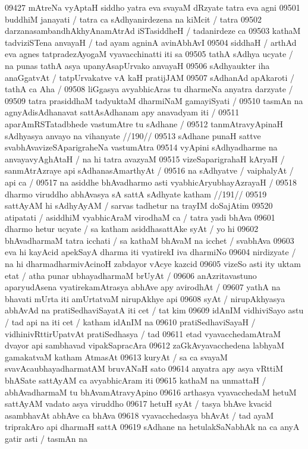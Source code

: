 09427 mAtreNa vyAptaH siddho yatra eva svayaM dRzyate tatra eva agni
09501 buddhiM janayati / tatra ca sAdhyanirdezena na kiMcit / tatra  
09502 darzanasambandhAkhyAnamAtrAd iSTasiddheH / tadanirdeze ca  
09503 kathaM tadviziSTena anvayaH / tad ayam agninA avinAbhAvI 
09504 siddhaH / arthAd eva agnes tatpradezAyogaM vyavacchinatti iti sa
09505 tathA sAdhya ucyate / na punas tathA asya upanyAsapUrvako anvayaH
09506 sAdhyaukter iha anaGgatvAt / tatpUrvakatve vA kaH pratijJAM  
09507 sAdhanAd apAkaroti / tathA ca Aha / 
09508 liGgasya avyabhicAras tu dharmeNa anyatra darzyate /
09509 tatra prasiddhaM tadyuktaM dharmiNaM gamayiSyati /  
09510 tasmAn na agnyAdisAdhanavat sattAsAdhanam apy anavadyam iti / 
09511 	aparAmRSTatadbhede vastumAtre tu sAdhane /
09512 	tanmAtravyApinaH sAdhyasya anvayo na vihanyate //190// 
09513 sAdhane punaH sattve svabhAvavizeSAparigraheNa vastumAtra
09514 vyApini sAdhyadharme na anvayavyAghAtaH / na hi tatra avazyaM 
09515 vizeSaparigrahaH kAryaH / sanmAtrAzraye api sAdhanasAmarthyAt /
09516 na sAdhyatve / vaiphalyAt / api ca /
09517 	na asiddhe bhAvadharmo asti vyabhicAryubhayAzrayaH / 
09518 	dharmo viruddho abhAvasya sA sattA sAdhyate katham //191// 
09519 sattAyAM hi sAdhyAyAM / sarvas tadhetur na trayIM doSajAtim
09520 atipatati / asiddhiM vyabhicAraM virodhaM ca / tatra yadi bhAva  
09601 dharmo hetur ucyate / sa katham asiddhasattAke syAt / yo hi
09602 bhAvadharmaM tatra icchati / sa kathaM bhAvaM na icchet / svabhAva 
09603 eva hi kayAcid apekSayA dharma iti vyatirekI iva dharmiNo  
09604 nirdizyate / na hi dharmadharmivAcinoH zabdayor vAcye kazcid 
09605 vizeSo asti ity uktam etat / atha punar ubhayadharmaM brUyAt /
09606 anAzritavastuno aparyudAsena vyatirekamAtrasya abhAve apy avirodhAt /
09607 yathA na bhavati mUrta iti amUrtatvaM nirupAkhye api
09608 syAt / nirupAkhyasya abhAvAd na pratiSedhaviSayatA iti cet / tat kim
09609 idAnIM vidhiviSayo astu / tad api na iti cet / katham idAnIM na
09610 pratiSedhaviSayaH / vidhinivRttirUpatvAt pratiSedhasya /  tad 
09611 etad vyavacchedamAtraM dvayor api sambhavad vipakSapracAra  
09612 zaGkAvyavacchedena labhyaM gamakatvaM katham AtmasAt
09613 kuryAt / sa ca svayaM svavAcaubhayadharmatAM bruvANaH sato
09614 anyatra apy asya vRttiM bhASate sattAyAM ca avyabhicAram iti 
09615 kathaM na unmattaH / abhAvadharmaM tu bhAvamAtravyApino
09616 arthasya vyavacchedaM hetuM sattAyAM vadato asya viruddho
09617 hetuH syAt / tasya bhAve kvacid asambhavAt abhAve ca bhAva 
09618 vyavacchedasya bhAvAt / tad ayaM triprakAro api dharmaH sattA  
09619 sAdhane na hetulakSaNabhAk na ca anyA gatir asti / tasmAn na  
